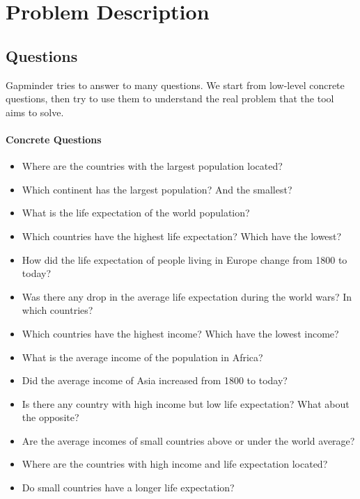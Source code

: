 \section{Problem Description}
\label{sec:problem}

\subsection{Questions}
Gapminder tries to answer to many questions.
We start from low-level concrete questions, then try to use them to understand the real problem that the tool aims to solve. 

\pagebreak

\paragraph{Concrete Questions}
\begin{itemize}

    \item Where are the countries with the largest population located?
    \item Which continent has the largest population? And the smallest?

    \item What is the life expectation of the world population?
    \item Which countries have the highest life expectation? Which have the lowest?
    \item How did the life expectation of people living in Europe change from 1800 to today?
    \item Was there any drop in the average life expectation during the world wars? In which countries?

    \item Which countries have the highest income? Which have the lowest income?
    \item What is the average income of the population in Africa?
    \item Did the average income of Asia increased from 1800 to today?  

    \item Is there any country with high income but low life expectation? What about the opposite?
    \item Are the average incomes of small countries above or under the world average?
    \item Where are the countries with high income and life expectation located?
    \item Do small countries have a longer life expectation?

\end{itemize}

